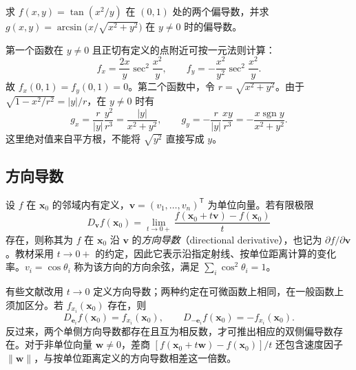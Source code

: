 \begin{example}
\label{ex:partial-derivative-computation-ch14}
求 $f(x,y)=\tan(x^2/y)$ 在 $(0,1)$ 处的两个偏导数，并求 $g(x,y)=\arcsin\bigl(x/\sqrt{x^2+y^2}\bigr)$ 在 $y\ne0$ 时的偏导数。
\end{example}
\begin{solve}
第一个函数在 $y\ne0$ 且正切有定义的点附近可按一元法则计算：
\[
    f_x=\frac{2x}{y}\sec^2\frac{x^2}{y},
    \qquad f_y=-\frac{x^2}{y^2}\sec^2\frac{x^2}{y}.
\]
故 $f_x(0,1)=f_y(0,1)=0$。第二个函数中，令 $r=\sqrt{x^2+y^2}$。由于 $\sqrt{1-x^2/r^2}=|y|/r$，在 $y\ne0$ 时有
\[
    g_x=\frac{r}{|y|}\frac{y^2}{r^3}
        =\frac{|y|}{x^2+y^2},
    \qquad
    g_y=-\frac{r}{|y|}\frac{xy}{r^3}
        =-\frac{x\operatorname{sgn}y}{x^2+y^2}.
\]
这里绝对值来自平方根，不能将 $\sqrt{y^2}$ 直接写成 $y$。
\end{solve}

\subsection{方向导数}
\label{subsec:directional-derivatives}

\begin{definition}
\label{def:one-sided-directional-derivative-ch14}
设 $f$ 在 $\boldsymbol x_0$ 的邻域内有定义，$\boldsymbol v=(v_1,\ldots,v_n)^{\mathsf T}$ 为单位向量。若有限极限
\begin{equation}
\label{eq:one-sided-directional-derivative-ch14}
    D_{\boldsymbol v}f(\boldsymbol x_0)
    =\lim_{t\to0+}\frac{f(\boldsymbol x_0+t\boldsymbol v)-f(\boldsymbol x_0)}{t}
\end{equation}
存在，则称其为 $f$ 在 $\boldsymbol x_0$ 沿 $\boldsymbol v$ 的\emph{方向导数}（directional derivative），也记为 $\partial f/\partial\boldsymbol v$。教材采用 $t\to0+$ 的约定，因此它表示沿指定射线、按单位距离计算的变化率。$v_i=\cos\theta_i$ 称为该方向的方向余弦，满足 $\sum_i\cos^2\theta_i=1$。
\end{definition}

有些文献改用 $t\to0$ 定义方向导数；两种约定在可微函数上相同，在一般函数上须加区分。若 $f_{x_i}(\boldsymbol x_0)$ 存在，则
\[
    D_{\boldsymbol e_i}f(\boldsymbol x_0)=f_{x_i}(\boldsymbol x_0),
    \qquad D_{-\boldsymbol e_i}f(\boldsymbol x_0)=-f_{x_i}(\boldsymbol x_0).
\]
反过来，两个单侧方向导数都存在且互为相反数，才可推出相应的双侧偏导数存在。对于非单位向量 $\boldsymbol w\ne0$，差商 $[f(\boldsymbol x_0+t\boldsymbol w)-f(\boldsymbol x_0)]/t$ 还包含速度因子 $\|\boldsymbol w\|$，与按单位距离定义的方向导数相差这一倍数。

